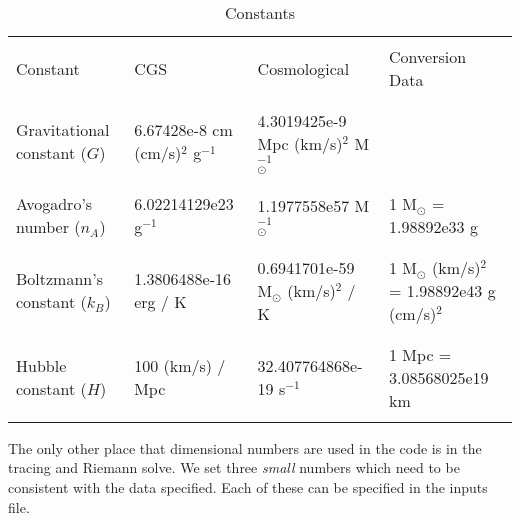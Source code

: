 \begin{table*}[h]
\begin{scriptsize}
\begin{center}
\begin{tabular}{|l|l|l|l|} \hline
          & & & \\
Constant & CGS & Cosmological & Conversion Data \\
          & & & \\
\hline
          & & & \\
Gravitational constant ($G$)                   & 6.67428e-8  cm (cm/s)$^2$  g$^{-1}$  
                                               & 4.3019425e-9 Mpc (km/s)$^2$  M$_\odot^{-1}$          
                                               &  \\
          & & & \\ \hline 
          & & & \\
Avogadro's number ($n_A$)                      &  6.02214129e23  g$^{-1}$ 
                                               &  1.1977558e57   M$_\odot^{-1}$
                                               &  1  M$_\odot$ = 1.98892e33 g  \\   
          & & & \\ \hline 
          & & & \\
Boltzmann's constant ($k_B$)                   &  1.3806488e-16 erg / K
                                               &  0.6941701e-59 M$_\odot$ (km/s)$^2$ / K
                                               & 1 M$_\odot$ (km/s)$^2$ = 1.98892e43 g (cm/s)$^2$ \\   
          & & & \\ \hline 
          & & & \\
Hubble constant ($H$)                          &  100 (km/s) / Mpc
                                               &  32.407764868e-19 s$^{-1}$
                                               &  1 Mpc = 3.08568025e19 km \\
          & & & \\ \hline 
\end{tabular}
\label{Table:Constants}
\caption{Constants}
\end{center}
\end{scriptsize}
\end{table*}

\clearpage

The only other place that dimensional numbers are used in the code is in the tracing and Riemann solve.  
We set three {\it small} numbers which need to be consistent with the data specified.  
Each of these can be specified in the inputs file.

